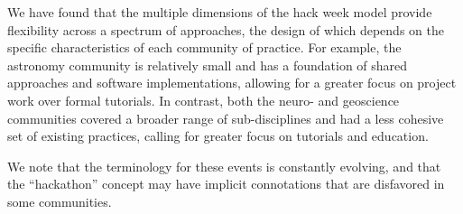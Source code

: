 We have found that the multiple dimensions of the hack week model provide flexibility across a spectrum of approaches, the design of which depends on the specific characteristics of each community of practice.
For example, the astronomy community is relatively small and has a foundation of shared approaches and software implementations, allowing for a greater focus on project work over formal tutorials.
In contrast, both the neuro- and geoscience communities covered a broader range of sub-disciplines and had a less cohesive set of existing practices, calling for greater focus on tutorials and education.

We note that the terminology for these events is constantly evolving, and that the ``hackathon'' concept may have implicit connotations that are disfavored in some communities.
